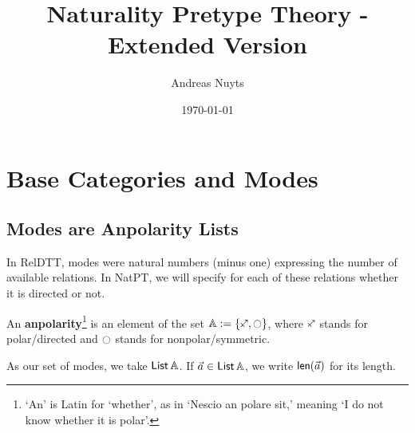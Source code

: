\documentclass[a4paper]{article}
\newcommand{\thetitle}{Naturality Pretype Theory - Extended Version}
\newcommand{\theauthors}{Andreas Nuyts}
\begin{document}
	\addtolength{\voffset}{-.5in}

\title{\thetitle}
\date{\today}
\author{\theauthors{}}
\maketitle

\tableofcontents

\pagebreak

\section{Base Categories and Modes}

\subsection{Modes are Anpolarity Lists}
In RelDTT, modes were natural numbers (minus one) expressing the number of available relations.
In NatPT, we will specify for each of these relations whether it is directed or not.
\begin{definition} \label{def:anpolarity}
	An \textbf{anpolarity}\footnote{`An' is Latin for `whether', as in `Nescio an polare sit,' meaning `I do not know whether it is polar'.} is an element of the set $\Anpolarity := \accol{\ypolar, \npolar}$, where $\ypolar$ stands for polar/directed and $\npolar$ stands for nonpolar/symmetric.
\end{definition}
\noindent As our set of modes, we take ${\mathsf{List}}\,{\mathbb{A}}$. If $\vec a \in {\mathsf{List}}\,{\mathbb{A}}$, we write $\mathsf{len}(\vec a)$ for its length.
\end{document}
